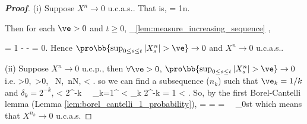 \begin{proof}[\bf Proof]
\ben
\item [(i)] Suppose $X^n \to 0$ u.c.a.s.. That is,
\be
\pro{} = 1\quad {}n\to \infty.
\ee

Then for each $\ve > 0$ and $t\geq 0$,
\be
\pro{} \geq {}_{\ref{lem:measure_increasing_sequence}} \geq \pro{},
\ee

\be
\pro{} = 1 - \pro{}  - \pro{} = 0.
\ee
Hence $\pro\bb{\sup_{0\leq s\leq t}|X^n_s| > \ve} \to 0$ and $X^n \to 0$ u.c.a.s..

\item [(ii)] Suppose $X^n \to 0$ u.c.p., then $\forall \ve>0$, $\pro\bb{\sup_{0\leq s\leq t}|X^n_s| > \ve} \to 0$ i.e.
\be
\forall \ve>0,\ \delta >0, \ \exists N,\ \forall n\geq N,\quad \pro{} < \delta.
\ee
so we can find a subsequence ($n_k$) such that $\ve_k = 1/k$ and $\delta_k = 2^{-k}$,
\be
\pro{} < 2^{-k} \ \ra \ \sum_{k=1}^\infty \pro{} < \sum_k 2^{-k} = 1 < \infty.
\ee
So, by the first Borel-Cantelli lemma (Lemma \ref{lem:borel_cantelli_1_probability}),
 = \pro{} = \pro{} = \pro{} \ \ra\ \sup_{0\leq s\leq t} \nonumber
\ee
which means that $X^{n_k} \to 0$ u.c.a.s.
\een
\end{proof}





